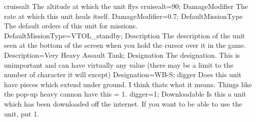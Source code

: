 \documentclass[a4paper,10pt]{article}
\begin{document}
cruisealt 	The altitude at which the unit flys 	cruisealt=90;
DamageModifier 	The rate at which this unit heals itself. 	DamageModifier=0.7;
DefaultMissionType 	The default orders of this unit for missions. 	DefaultMissionType=VTOL\_standby;
Description 	The description of the unit seen at the bottom of the screen when you hold the cursor over it in the game. 	Description=Very Heavy Assault Tank;
Designation 	The designation. This is unimportant and can have virtually any value (there may be a limit to the number of character it will except) 	Designation=WB-S;
digger 	Does this unit have pieces which extend under ground.  I think thats what it means. Things like the pop-up heavy cannon have this = 1. 	digger=1;
Downloadable 	Is this a unit which has been downloaded off the internet. If you want to be able to use the unit, put 1.
\end{document}
